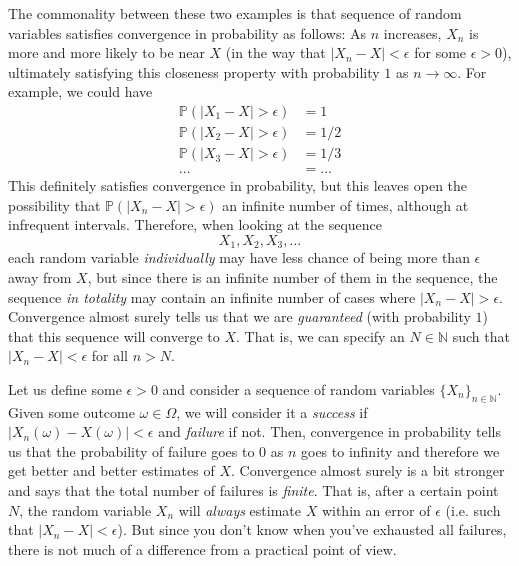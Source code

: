     The commonality between these two examples is that sequence of random variables satisfies convergence in probability as follows: As $n$ increases, $X_n$ is more and more likely to be near $X$ (in the way that $|X_n - X| < \epsilon$ for some $\epsilon > 0$), ultimately satisfying this closeness property with probability $1$ as $n \rightarrow \infty$. For example, we could have 
    \begin{align*}
      \mathbb{P}(|X_1 - X| > \epsilon) & = 1 \\
      \mathbb{P}(|X_2 - X| > \epsilon) & = 1/2 \\
      \mathbb{P}(|X_3 - X| > \epsilon) & = 1/3 \\
      \ldots & = \ldots 
    \end{align*}
    This definitely satisfies convergence in probability, but this leaves open the possibility that $\mathbb{P}(|X_n - X| > \epsilon)$ an infinite number of times, although at infrequent intervals. Therefore, when looking at the sequence 
    \begin{equation}
      X_1, X_2, X_3, \ldots
    \end{equation}
    each random variable \textit{individually} may have less chance of being more than $\epsilon$ away from $X$, but since there is an infinite number of them in the sequence, the sequence \textit{in totality} may contain an infinite number of cases where $|X_n - X| > \epsilon$. Convergence almost surely tells us that we are \textit{guaranteed} (with probability $1$) that this sequence will converge to $X$. That is, we can specify an $N \in \mathbb{N}$ such that $|X_n - X| < \epsilon$ for all $n > N$. 

    Let us define some $\epsilon > 0$ and consider a sequence of random variables $\{X_n\}_{n \in \mathbb{N}}$. Given some outcome $\omega \in \Omega$, we will consider it a \textit{success} if $|X_n(\omega) - X(\omega)| < \epsilon$ and \textit{failure} if not. Then, convergence in probability tells us that the probability of failure goes to $0$ as $n$ goes to infinity and therefore we get better and better estimates of $X$. Convergence almost surely is a bit stronger and says that the total number of failures is \textit{finite}. That is, after a certain point $N$, the random variable $X_n$ will \textit{always} estimate $X$ within an error of $\epsilon$ (i.e. such that $|X_n - X| < \epsilon$). But since you don't know when you've exhausted all failures, there is not much of a difference from a practical point of view. 

